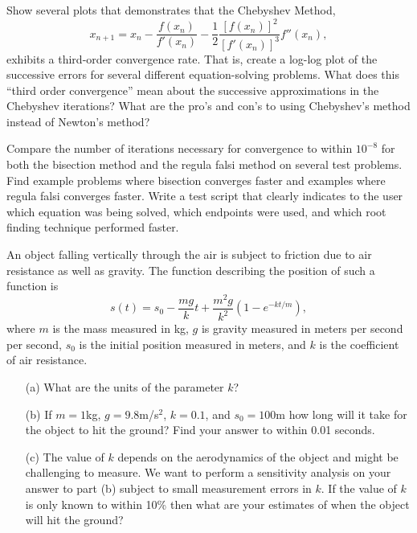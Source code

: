 \begin{problem}
    Show several plots that demonstrates that the Chebyshev Method,
    \[ x_{n+1} = x_n - \frac{f(x_n)}{f'(x_n)} - \frac{1}{2} \frac{[f(x_n)]^2}{[f'(x_n)]^3}
f''(x_n), \]
    exhibits a third-order convergence rate. That is, create a log-log plot of the
    successive errors for several different equation-solving problems.  What does this
    ``third order convergence'' mean about the successive
    approximations in the Chebyshev iterations?  What are the pro's and con's to using
    Chebyshev's method instead of Newton's method?
\end{problem}





\begin{problem}
    Compare the number of iterations necessary for convergence to within $10^{-8}$ for
    both the bisection method and the regula falsi method on several test problems. Find
    example problems where bisection converges faster and examples where regula falsi
    converges faster. Write a test script that clearly indicates to the user which
    equation was being solved, which endpoints were used, and which root finding technique
    performed faster.
\end{problem}

\begin{problem}
    An object falling vertically through the air is subject to friction due to air
    resistance as well as gravity.  The function describing the position of such a
    function is 
    \[ s(t) = s_0 - \frac{mg}{k} t + \frac{m^2 g}{k^2}\left( 1- e^{-kt/m} \right), \]
    where $m$ is the mass measured in kg, $g$ is gravity measured in meters per second per
    second, $s_0$ is the
    initial position measured in meters, and $k$ is the
    coefficient of air resistance.
    \begin{enumerate}
        \item[(a)] What are the units of the parameter $k$?
        \item[(b)] If $m = 1$kg, $g=9.8$m/s$^2$, $k=0.1$, and $s_0 = 100$m how long will it take
            for the object to hit the ground?  Find your answer to within 0.01 seconds.
        \item[(c)] The value of $k$ depends on the aerodynamics of the object and might be
            challenging to measure.  We want to perform a sensitivity analysis on your
            answer to part (b) subject to small measurement errors in $k$.  If the value
            of $k$ is only known to within 10\% then what are your estimates of when the
            object will hit the ground?
    \end{enumerate}
\end{problem}



